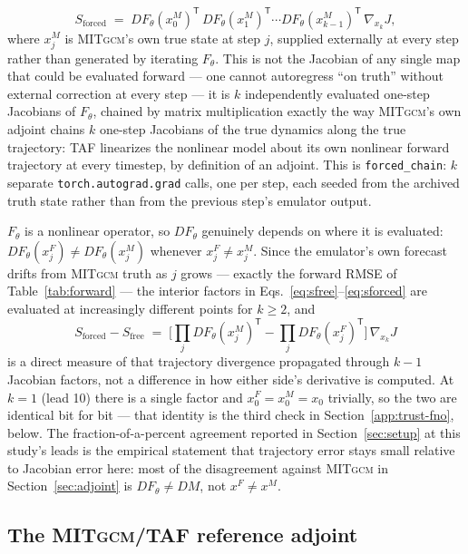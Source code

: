 \documentclass[3p,12pt]{elsarticle}
\newcommand{\MITgcm}{\textsc{MITgcm}}
\begin{document}
\begin{equation}
S_{\mathrm{forced}} \;=\;
DF_\theta(x_0^M)^{\mathsf T}\,DF_\theta(x_1^M)^{\mathsf T}\cdots
DF_\theta(x_{k-1}^M)^{\mathsf T}\,\nabla_{x_k}J,
\label{eq:sforced}
\end{equation}
where $x_j^M$ is \MITgcm{}'s own true state at step $j$, supplied externally
at every step rather than generated by iterating $F_\theta$. This is not the
Jacobian of any single map that could be evaluated forward --- one cannot
autoregress ``on truth'' without external correction at every step --- it is
$k$ independently evaluated one-step Jacobians of $F_\theta$, chained by
matrix multiplication exactly the way \MITgcm{}'s own adjoint chains $k$
one-step Jacobians of the true dynamics along the true trajectory: TAF
linearizes the nonlinear model about its own nonlinear forward trajectory at
every timestep, by definition of an adjoint. This is \texttt{forced\_chain}:
$k$ separate \texttt{torch.autograd.grad} calls, one per step, each seeded
from the archived truth state rather than from the previous step's emulator
output.

$F_\theta$ is a nonlinear operator, so $DF_\theta$ genuinely depends on where
it is evaluated: $DF_\theta(x_j^F)\neq DF_\theta(x_j^M)$ whenever
$x_j^F\neq x_j^M$. Since the emulator's own forecast drifts from \MITgcm{}
truth as $j$ grows --- exactly the forward RMSE of Table~\ref{tab:forward} ---
the interior factors in Eqs.~\eqref{eq:sfree}--\eqref{eq:sforced} are
evaluated at increasingly different points for $k\ge2$, and
\begin{equation}
S_{\mathrm{forced}} - S_{\mathrm{free}} \;=\;
\Big[\textstyle\prod_{j} DF_\theta(x_j^M)^{\mathsf T}
- \prod_{j} DF_\theta(x_j^F)^{\mathsf T}\Big]\,\nabla_{x_k}J
\label{eq:forced-free-gap}
\end{equation}
is a direct measure of that trajectory divergence propagated through $k-1$
Jacobian factors, not a difference in how either side's derivative is
computed. At $k=1$ (lead 10) there is a single factor and $x_0^F=x_0^M=x_0$
trivially, so the two are identical bit for bit --- that identity is the
third check in Section~\ref{app:trust-fno}, below. The fraction-of-a-percent
agreement reported in Section~\ref{sec:setup} at this study's leads is the
empirical statement that trajectory error stays small relative to Jacobian
error here: most of the disagreement against \MITgcm{} in
Section~\ref{sec:adjoint} is $DF_\theta\neq DM$, not $x^F\neq x^M$.

\subsection{The \MITgcm{}/TAF reference adjoint}
\label{app:trust-mitgcm}
\end{document}
